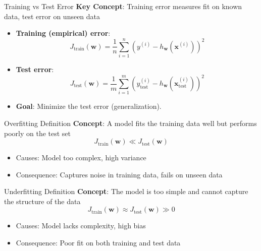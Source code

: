 \documentclass[serif, aspectratio=169]{beamer}
\begin{document}
\begin{frame}{Training vs Test Error}
    \textbf{Key Concept}: Training error measures fit on known data, test error on unseen data
    \begin{itemize}
        \item \textbf{Training (empirical) error}:
        \[
        J_{\text{train}}(\mathbf{w}) = \frac{1}{n} \sum_{i=1}^{n} \left( y^{(i)} - h_{\mathbf{w}}(\mathbf{x}^{(i)}) \right)^2
        \]
        \item \textbf{Test error}:
        \[
        J_{\text{test}}(\mathbf{w}) = \frac{1}{m} \sum_{i=1}^{m} \left(y_{\text{test}}^{(i)} - h_{\mathbf{w}}(\mathbf{x}_{\text{test}}^{(i)})\right)^2
        \]
        \item \textbf{Goal}: Minimize the test error (generalization).
    \end{itemize}
\end{frame}

\begin{frame}{Overfitting Definition}
    \textbf{Concept}: A model fits the training data well but performs poorly on the test set
    \[
    J_{\text{train}}(\mathbf{w}) \ll J_{\text{test}}(\mathbf{w})
    \]
    \begin{itemize}
        \item Causes: Model too complex, high variance
        \item Consequence: Captures noise in training data, fails on unseen data
    \end{itemize}
\end{frame}



\begin{frame}{Underfitting Definition}
    \textbf{Concept}: The model is too simple and cannot capture the structure of the data
    \[
    J_{\text{train}}(\mathbf{w}) \approx J_{\text{test}}(\mathbf{w}) \gg 0
    \]
    \begin{itemize}
        \item Causes: Model lacks complexity, high bias
        \item Consequence: Poor fit on both training and test data
    \end{itemize}
\end{frame}
\end{document}
